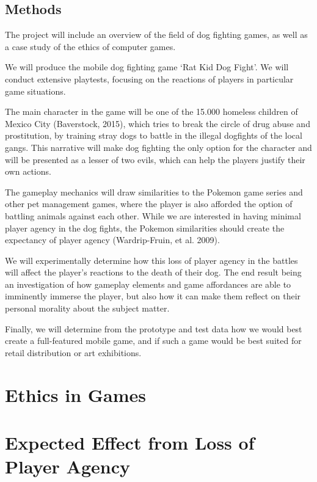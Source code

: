 \documentclass[preprint,12pt, authoryear]{elsarticle}
\begin{document}
\subsection{Methods}
The project will include an overview of the field of dog fighting games, as well as a case study of the ethics of computer games. \

We will produce the mobile dog fighting game ‘Rat Kid Dog Fight’. We will conduct extensive playtests, focusing on the reactions of players in particular game situations.\

The main character in the game will be one of the 15.000 homeless children of Mexico City (Baverstock, 2015), which tries to break the circle of drug abuse and prostitution, by training stray dogs to battle in the illegal dogfights of the local gangs. This narrative will make dog fighting the only option for the character and will be presented as a lesser of two evils, which can help the players justify their own actions. \

The gameplay mechanics will draw similarities to the Pokemon game series and other pet management games, where the player is also afforded the option of battling animals against each other. While we are interested in having minimal player agency in the dog fights, the Pokemon similarities should create the expectancy of player agency (Wardrip-Fruin, et al. 2009). \

We will experimentally determine how this loss of player agency in the battles will affect the player’s reactions to the death of their dog. The end result being an investigation of how gameplay elements and game affordances are able to imminently immerse the player, but also how it can make them reflect on their personal morality about the subject matter.\

Finally, we will determine from the prototype and test data how we would best create a full-featured mobile game, and if such a game would be best suited for retail distribution or art exhibitions.\

\section{Ethics in Games}
\label{Ethics}


\section{Expected Effect from Loss of Player Agency}
\label{Agency}

\end{document}
